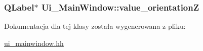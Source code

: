 \subsubsection[{\texorpdfstring{value\+\_\+orientationZ}{value_orientationZ}}]{\setlength{\rightskip}{0pt plus 5cm}Q\+Label$\ast$ Ui\+\_\+\+Main\+Window\+::value\+\_\+orientationZ}\hypertarget{class_ui___main_window_a3c384c66c75b77b8d0e1f517f2b52f29}{}\label{class_ui___main_window_a3c384c66c75b77b8d0e1f517f2b52f29}


Dokumentacja dla tej klasy została wygenerowana z pliku\+:\begin{DoxyCompactItemize}
\item 
\hyperlink{ui__mainwindow_8hh}{ui\+\_\+mainwindow.\+hh}\end{DoxyCompactItemize}
